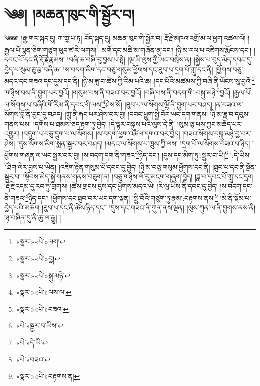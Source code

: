 \chapter{༄༅། །མཆན་ཁུང་གི་སྦྱོར་བ།}༄༅༅། །རྒྱ་གར་སྐད་དུ། ཀ་ཀྵ་པ་ཏ། བོད་སྐད་དུ། མཆན་ཁུང་གི་སྦྱོར་བ། རྡོ་རྗེ་མཁའ་འགྲོ་མ་ལ་ཕྱག་འཚལ་ལོ། །རྒྱལ་པོ་ལྷན་ཅིག་གཙུག་ཕུད་ཛ་རི་ལགས།\footnote{«སྣར་»«པེ་»ལག།} མགོ་དང་མཆི་མ་གཞོན་ནུ་དང་། །ཉི་མ་རལ་པ་འཇིགས་རྨོངས་དང་། །དབང་པོ་དང་ནི་རྡོ་རྗེ་རྣམས། །བཞི་ཆ་བཞི་རུ་བྱས་པ་སྟེ། །ལྔ་ཡི་ལུས་ཀྱི་ཡང་བསྲེས་ན། །སྐྱེས་པ་བུད་མེད་དབང་དུ་བྱེད་པ་སུམ་ཅུ་རྩ་བཞི་ཆ། །ས་བདག་མིག་དང་བཅུ་གསུམ་ཕྱོགས་དང་ཐུབ་པ་དྲག་པོ་ཀླུ་དང་ནི། །ཕྱོགས་བཅུ་མདའ་དང་གཟའ་དང་དུས་དང་ནི། །ཉི་མ་ཟླ་བ་ཚེས་ཀྱི་རིམ་པའི་ཆ། །དང་པོའི་མཚམས་ཀྱི་བཞི་ནི་ཡོངས་སུ་བྱའོ།\footnote{«སྣར་»«པེ་»བྱ།} །གཉིས་བས་ནི་བྱུག་པར་བྱའོ། །གསུམ་པས་ནི་བཟའ་བར་བྱའོ། །བཞི་པས་ནི་བདག་གི་:བསྐུ་མཉེ་\footnote{«སྣར་»«པེ་»སྐུ་མཉེ་}བྱའོ། །རྒྱལ་པོ་ལ་སོགས་པ་བཞིའི་གོ་རིམ་ནི་དབང་གི་ལས་\footnote{«སྣར་»«པེ་»ལས་ལ་}ཤེས་སོ། །ཐུབ་པ་ལ་སོགས་ལྷོ་ནི་བྱུག་པར་བཤད། །ན་བཟའ་ལ་སོགས་བློ་ནི་བྱང་དུ་བཤད། །ཀླུ་ནི་རྐང་པར་ཤེས་བར་བྱ། །དབང་ཕྱུག་སྤྱི་བོར་ཡང་དག་གནས། །ཉི་མ་ཟླ་བ་དབུས་གནས་པས། །དགོས་པ་ཐམས་ཅད་རྟག་ཏུ་བྱེད། །དེ་ལྟར་བསྐུས་པའི་ལུས་དེ་ནི། །སུམ་ཅུ་པས་ཀྱང་མཆོད་པར་འགྱུར། །བདུག་པ་བཅུ་དྲུག་པ་ལ་སོགས། །ས་བདག་ཕྱག་འཚལ་དགའ་བར་བྱེད། །བཟའ་སོགས་བསྐུ་མཉེ་བྱ་བར་ཤེས། །དུས་སོགས་མིག་སྨན་སྦྱར་བར་བཤད། །མདའ་ལ་སོགས་པ་ཁྲུས་ཀྱི་ལས། །དྲག་པོ་ལ་སོགས་བཟའ་བ་ཉིད། །ཕྱོགས་གཞན་ལ་ཡང་སྦྱར་བར་བྱ། །ས་བདག་དག་ནི་གཟའ་\footnote{«སྣར་»«པེ་»བཟའ་}ཉིད་དང་། །དུས་དང་མིག་ཏུ་:སྦྱར་བ་ཡི།\footnote{«པེ་»སྦྱར་བ་ཡིས།} །:དེ་ཡིས་\footnote{«པེ་»དེ་ཡི་}ཐིག་ལེར་བྱས་པ་ཡིན། །འཇིག་རྟེན་གསུམ་པོ་དབང་དུ་བྱེད། །ཉི་མ་བཅུ་གསུམ་ཕྱོགས་དང་ནི། །ཐུབ་པ་དང་ནི་སྔོན་སྦྱར་བ། །སྟོབས་མེད་སྐྱེ་གནས་གནས་བཅུག་ན། །བཅུ་གཉིས་ལོ་རུ་མངག་གཞུག་བྱེད། །ཟླ་བ་དབང་པོ་ཀླུ་དང་དྲག །རྡོ་རྗེ་འདམ་དུ་རབ་ཏུ་གྲགས། །ཚེས་གྲངས་དུས་དང་ཕྱོགས་མདའ་ཡི། །རི་ལུ་ཡིས་ནི་དབང་དུ་བྱེད། །ས་བདག་དང་ནི་གཟའ་\footnote{«པེ་»བཟའ་}ཉིད་དང་། །ཕྱོགས་དང་ཐུབ་བར་ཡང་དག་ལྡན། །སྤྱི་བོའི་གཙུག་ཏུ་རྣམ་:བརྟགས་ནས།\footnote{«སྣར་»«པེ་»བརྟགས་ན།} །མེ་ནི་སྡོམ་པ་བྱེད་པའི་མཆོག །ཐུབ་པ་དང་ནི་ཚེས་ཉིད་དང་། །དུས་དང་གཟའ་ནི་ཀུན་ནས་ལྡན། །ལུས་ཀུན་ལ་ནི་བྱུགས་ནས་ནི། །ཉ་བཞིན་དུ་ནི་ཆུ་ལ་རྒྱུ། །
